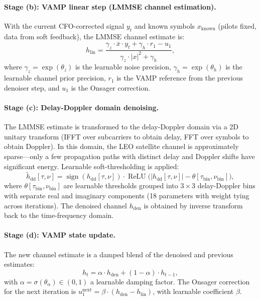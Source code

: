 \documentclass{article}
\begin{document}
\paragraph{Stage (b): VAMP linear step (LMMSE channel estimation).}
With the current CFO-corrected signal $y_t$ and known symbols $x_{\mathrm{known}}$ (pilots fixed, data from soft feedback), the LMMSE channel estimate is:
\begin{equation}
h_{\mathrm{lin}} = \frac{\gamma_z \cdot \overline{x} \cdot y_t + \gamma_h \cdot r_1 - u_1}{\gamma_z \cdot |x|^2 + \gamma_h},
\label{eq:lmmse}
\end{equation}
where $\gamma_z = \exp(\theta_z)$ is the learnable noise precision, $\gamma_h = \exp(\theta_h)$ is the learnable channel prior precision, $r_1$ is the VAMP reference from the previous denoiser step, and $u_1$ is the Onsager correction.

\paragraph{Stage (c): Delay-Doppler domain denoising.}
The LMMSE estimate is transformed to the delay-Doppler domain via a 2D unitary transform (IFFT over subcarriers to obtain delay, FFT over symbols to obtain Doppler). In this domain, the LEO satellite channel is approximately sparse---only a few propagation paths with distinct delay and Doppler shifts have significant energy. Learnable soft-thresholding is applied:
\begin{equation}
\tilde{h}_{\mathrm{dd}}[\tau, \nu] = \operatorname{sign}(h_{\mathrm{dd}}[\tau, \nu]) \cdot \operatorname{ReLU}\bigl(|h_{\mathrm{dd}}[\tau, \nu]| - \theta[\tau_{\mathrm{bin}}, \nu_{\mathrm{bin}}]\bigr),
\end{equation}
where $\theta[\tau_{\mathrm{bin}}, \nu_{\mathrm{bin}}]$ are learnable thresholds grouped into $3 \times 3$ delay-Doppler bins with separate real and imaginary components (18 parameters with weight tying across iterations). The denoised channel $h_{\mathrm{den}}$ is obtained by inverse transform back to the time-frequency domain.

\paragraph{Stage (d): VAMP state update.}
The new channel estimate is a damped blend of the denoised and previous estimates:
\begin{equation}
h_t = \alpha \cdot h_{\mathrm{den}} + (1 - \alpha) \cdot h_{t-1},
\end{equation}
with $\alpha = \sigma(\theta_\alpha) \in (0, 1)$ a learnable damping factor. The Onsager correction for the next iteration is $u_1^{\mathrm{next}} = \beta \cdot (h_{\mathrm{den}} - h_{\mathrm{lin}})$, with learnable coefficient $\beta$.
\end{document}
